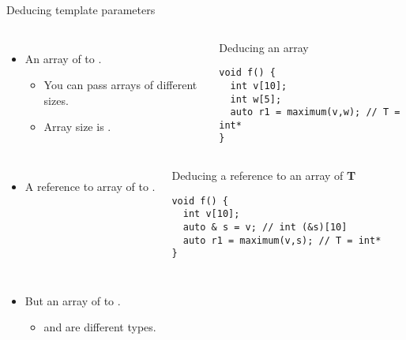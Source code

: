 \begin{frame}{Deducing template parameters}
\begin{columns}
\begin{itemize}
  \item An array of   to .
    \begin{itemize}
      \item You can pass arrays of different sizes.
      \item Array size is .
    \end{itemize}
\end{itemize}

\begin{block}{Deducing an array}
\begin{lstlisting}
void f() {
  int v[10];
  int w[5];
  auto r1 = maximum(v,w); // T = int*
}
\end{lstlisting}
\end{block}

\end{columns}


\begin{columns}
\begin{itemize}
  \item A reference to array of   to .
\end{itemize}

\begin{block}{Deducing a reference to an array of \textbf{T}}
\begin{lstlisting}
void f() {
  int v[10];
  auto & s = v; // int (&s)[10]
  auto r1 = maximum(v,s); // T = int*
}
\end{lstlisting}
\end{block}

\end{columns}

\framebreak


\begin{columns}
\begin{itemize}
  \item But an array of   to .
    \begin{itemize}
      \item {} and  are different types.
    \end{itemize}
\end{itemize}


\end{columns}
\end{frame}
